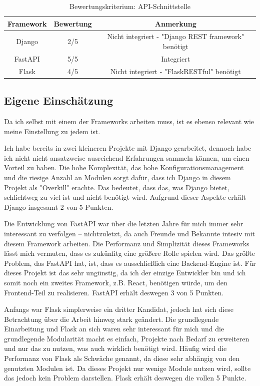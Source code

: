 \documentclass[letterpaper,11pt,leqno]{article}
\begin{document}
\begin{table}[h!]
	\begin{center}
		\begin{tabular}{|c||c|c|}
			\hline
			Framework & Bewertung & Anmerkung\\
			\hline\hline
			Django & 2/5 & Nicht integriert - "Django REST framework" benötigt\\
			FastAPI & 5/5 & Integriert\\
			Flask & 4/5 & Nicht integriert - "FlaskRESTful" benötigt\\
			\hline
		\end{tabular}
		\caption{Bewertungskriterium: API-Schnittstelle}
	\end{center}
	\label{table:5}
\end{table}

\subsection{Eigene Einschätzung}
Da ich selbst mit einem der Frameworks arbeiten muss, ist es ebenso relevant wie meine Einstellung
zu jedem ist.

Ich habe bereits in zwei kleineren Projekte mit Django gearbeitet, dennoch habe ich nicht nicht
ansatzweise ausreichend Erfahrungen sammeln können, um einen Vorteil zu haben. Die hohe Komplexität,
das hohe Konfigurationsmanagement und die riesige Anzahl an Modulen sorgt dafür, dass ich Django in
diesem Projekt als "Overkill" erachte. Das bedeutet, dass das, was Django bietet, schlichtweg zu
viel ist und nicht benötigt wird. Aufgrund dieser Aspekte erhält Django insgesamt 2 von 5 Punkten.

Die Entwicklung von FastAPI war über die letzten Jahre für mich immer sehr interessant zu verfolgen
– nichtzuletzt, da auch Freunde und Bekannte intesiv mit diesem Framework arbeiten. Die Performanz
und Simplizität dieses Frameworks lässt mich vermuten, dass es zukünfitg eine größere Rolle spielen
wird. Das größte Problem, das FastAPI hat, ist, dass es ausschließlich eine Backend-Engine ist. Für
dieses Projekt ist das sehr ungünstig, da ich der einzige Entwickler bin und ich somit noch ein
zweites Framework, z.B. React, benötigen würde, um den Frontend-Teil zu realisieren. FastAPI erhält
deswegen 3 von 5 Punkten.

Anfangs war Flask simplerweise ein dritter Kandidat, jedoch hat sich diese Betrachtung über die
Arbeit hinweg stark geändert. Die grundlegende Einarbeitung und Flask an sich waren sehr interessant
für mich und die grundlegende Modularität macht es einfach, Projekte nach Bedarf zu erweiteren und
nur das zu nutzen, was auch wirklich benötigt wird. Häufig wird die Performanz von Flask als
Schwäche genannt, da diese sehr abhängig von den genutzten Modulen ist. Da dieses Projekt nur wenige
Module nutzen wird, sollte das jedoch kein Problem darstellen. Flask erhält deswegen die vollen 5
Punkte.
\end{document}
